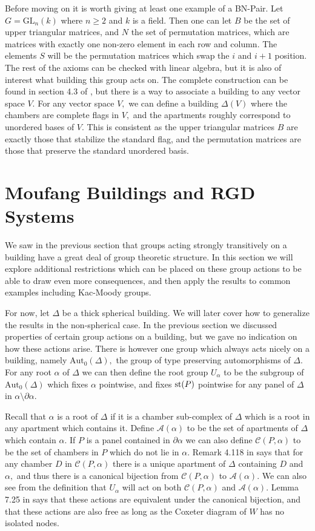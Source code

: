 \documentclass[class=book, crop=false,12 pt]{standalone}
\begin{document}
Before moving on it is worth giving at least one example of a BN-Pair. Let $G=\mathrm{GL}_n(k)$ where $n\ge 2$ and $k$ is a field. Then one can let $B$ be the set of upper triangular matrices, and $N$ the set of permutation matrices, which are matrices with exactly one non-zero element in each row and column. The elements $S$ will be the permutation matrices which swap the $i$ and $i+1$ position. The rest of the axioms can be checked with linear algebra, but it is also of interest what building this group acts on. The complete construction can be found in section 4.3 of \cite{buildings}, but there is a way to associate a building to any vector space $V.$ For any vector space $V,$ we can define a building $\Delta(V)$ where the chambers are complete flags in $V,$ and the apartments roughly correspond to unordered bases of $V.$ This is consistent as the upper triangular matrices $B$ are exactly those that stabilize the standard flag, and the permutation matrices are those that preserve the standard unordered basis.

\section{Moufang Buildings and RGD Systems}
We saw in the previous section that groups acting strongly transitively on a building have a great deal of group theoretic structure. In this section we will explore additional restrictions which can be placed on these group actions to be able to draw even more consequences, and then apply the results to common examples including Kac-Moody groups.

For now, let $\Delta$ be a thick spherical building. We will later cover how to generalize the results in the non-spherical case. In the previous section we discussed properties of certain group actions on a building, but we gave no indication on how these actions arise. There is however one group which always acts nicely on a building, namely $\mathrm{Aut}_0(\Delta),$ the group of type preserving automorphisms of $\Delta.$ For any root $\alpha$ of $\Delta$ we can then define the root group $U_\alpha$ to be the subgroup of $\mathrm{Aut}_0(\Delta)$ which fixes $\alpha$ pointwise, and fixes $\mathrm{st}(P)$ pointwise for any panel of $\Delta$ in $\alpha\setminus \partial\alpha.$

Recall that $\alpha$ is a root of $\Delta$ if it is a chamber sub-complex of $\Delta$ which is a root in any apartment which contains it. Define $\mathcal{A}(\alpha)$ to be the set of apartments of $\Delta$ which contain $\alpha.$ If $P$ is a panel contained in $\partial\alpha$ we can also define $\mathcal{C}(P,\alpha)$ to be the set of chambers in $P$ which do not lie in $\alpha.$ Remark 4.118 in \cite{buildings} says that for any chamber $D$ in $\mathcal{C}(P,\alpha)$ there is a unique apartment of $\Delta$ containing $D$ and $\alpha,$ and thus there is a canonical bijection from $\mathcal{C}(P,\alpha)$ to $\mathcal{A}(\alpha).$ We can also see from the definition that $U_\alpha$ will act on both $\mathcal{C}(P,\alpha)$ and $\mathcal{A}(\alpha).$ Lemma 7.25 in \cite{buildings} says that these actions are equivalent under the canonical bijection, and that these actions are also free as long as the Coxeter diagram of $W$ has no isolated nodes. 
\end{document}
